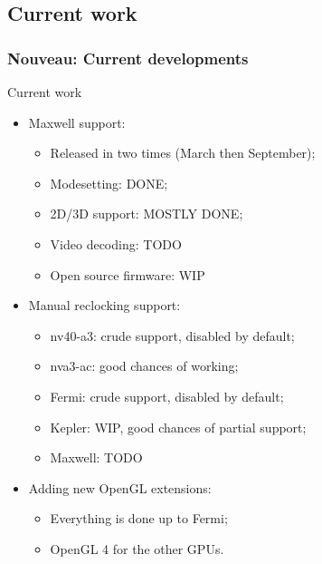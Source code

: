 \documentclass[11pt,english,compress]{beamer}
\begin{document}
\subsection{Current work}
\begin{frame}
	\frametitle{Nouveau: Current developments}

	\begin{block}{Current work}
		\begin{itemize}
			\item Maxwell support:
			\begin{itemize}
				\item Released in two times (March then September);
				\item Modesetting: DONE;
				\item 2D/3D support: MOSTLY DONE;
				\item Video decoding: TODO
				\item Open source firmware: WIP
			\end{itemize}
			\item Manual reclocking support:
			\begin{itemize}
				\item nv40-a3: crude support, disabled by default;
				\item nva3-ac: good chances of working;
				\item Fermi: crude support, disabled by default;
				\item Kepler: WIP, good chances of partial support;
				\item Maxwell: TODO
			\end{itemize}
			\item Adding new OpenGL extensions:
			\begin{itemize}
				\item Everything is done up to Fermi;
				\item OpenGL 4 for the other GPUs.
			\end{itemize}
		\end{itemize}
	\end{block}
\end{frame}
\end{document}
